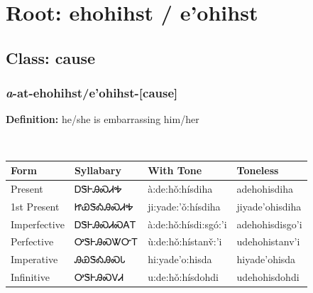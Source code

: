 \needspace{4in}
\section*{Root: ehohihst / e'ohihst}
\nopagebreak
{}
\needspace{3in}
\subsection*{Class: cause}
\nopagebreak
\needspace{2in}
\subsubsection*{\textit{a}{-}at{-}\textbf{ehohihst/e'ohihst}{-}[cause]}
\nopagebreak
\textbf{Definition: } he/she is embarrassing him/her
\\[0.5em]
\begin{tabularx}{\textwidth}{l X X X}%
\toprule%
\textbf{Form}&\textbf{Syllabary}&\textbf{With Tone}&\textbf{Toneless}\\%
\midrule%
Present&ᎠᏕᎰᎯᏍᏗᎭ&à:de:hǒ:hísdiha&adehohisdiha\\%
1st Present&ᏥᏯᏕᎣᎯᏍᏗᎭ&ji:yade:’ǒ:hísdiha&jiyade’ohisdiha\\%
Imperfective&ᎠᏕᎰᎯᏍᏗᏍᎪᎢ&à:de:hǒ:hísdi:sgó:’i&adehohisdisgo’i\\%
Perfective&ᎤᏕᎰᎯᏍᏔᏅᎢ&ù:de:hǒ:hístanv̌:’i&udehohistanv’i\\%
Imperative&ᎯᏯᏕᎣᎯᏍᏓ&hi:yade’o:hisda&hiyade’ohisda\\%
Infinitive&ᎤᏕᎰᎯᏍᏙᏗ&u:de:hǒ:hísdohdi&udehohisdohdi\\%
\bottomrule%
\end{tabularx}
\\[1em]
